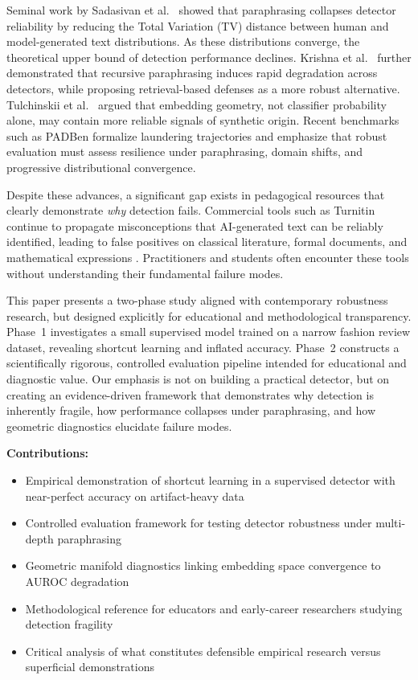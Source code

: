 \documentclass[conference]{IEEEtran}
\begin{document}
Seminal work by Sadasivan et al.~\cite{sadasivan2023can} showed that paraphrasing collapses detector reliability by reducing the Total Variation (TV) distance between human and model-generated text distributions. As these distributions converge, the theoretical upper bound of detection performance declines. Krishna et al.~\cite{krishna2023paraphrasing} further demonstrated that recursive paraphrasing induces rapid degradation across detectors, while proposing retrieval-based defenses as a more robust alternative. Tulchinskii et al.~\cite{tulchinskii2023intrinsic} argued that embedding geometry, not classifier probability alone, may contain more reliable signals of synthetic origin. Recent benchmarks such as PADBen \cite{zha2024padben} formalize laundering trajectories and emphasize that robust evaluation must assess resilience under paraphrasing, domain shifts, and progressive distributional convergence.

Despite these advances, a significant gap exists in pedagogical resources that clearly demonstrate \emph{why} detection fails. Commercial tools such as Turnitin continue to propagate misconceptions that AI-generated text can be reliably identified, leading to false positives on classical literature, formal documents, and mathematical expressions \cite{liang2023gpt}. Practitioners and students often encounter these tools without understanding their fundamental failure modes.

This paper presents a two-phase study aligned with contemporary robustness research, but designed explicitly for educational and methodological transparency. Phase~1 investigates a small supervised model trained on a narrow fashion review dataset, revealing shortcut learning and inflated accuracy. Phase~2 constructs a scientifically rigorous, controlled evaluation pipeline intended for educational and diagnostic value. Our emphasis is not on building a practical detector, but on creating an evidence-driven framework that demonstrates why detection is inherently fragile, how performance collapses under paraphrasing, and how geometric diagnostics elucidate failure modes.

\textbf{Contributions:}
\begin{itemize}
    \item Empirical demonstration of shortcut learning in a supervised detector with near-perfect accuracy on artifact-heavy data
    \item Controlled evaluation framework for testing detector robustness under multi-depth paraphrasing
    \item Geometric manifold diagnostics linking embedding space convergence to AUROC degradation
    \item Methodological reference for educators and early-career researchers studying detection fragility
    \item Critical analysis of what constitutes defensible empirical research versus superficial demonstrations
\end{itemize}
\end{document}
